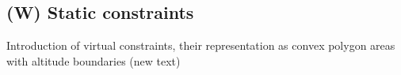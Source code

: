 \subsection{(W) Static constraints}\label{s:virtualConstraints}
    \noindent Introduction of virtual constraints, their representation as convex polygon areas with altitude boundaries (new text)
    
